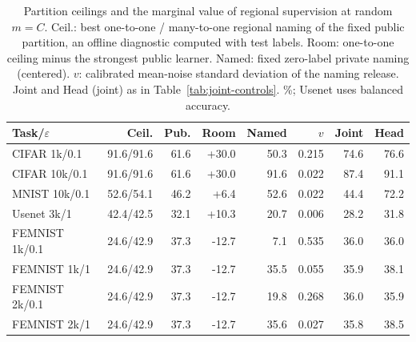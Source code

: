 \begin{table}[t]
\caption{Partition ceilings and the marginal value of regional supervision at random $m=C$. Ceil.: best one-to-one / many-to-one regional naming of the fixed public partition, an offline diagnostic computed with test labels. Room: one-to-one ceiling minus the strongest public learner. Named: fixed zero-label private naming (centered). $v$: calibrated mean-noise standard deviation of the naming release. Joint and Head (joint) as in Table~\ref{tab:joint-controls}. \%; Usenet uses balanced accuracy.}
\label{tab:ceiling}\small
\centering
\setlength{\tabcolsep}{2.6pt}
\begin{tabular}{@{}lrrrrrrr@{}}\toprule
Task/$\varepsilon$ & Ceil. & Pub. & Room & Named & $v$ & Joint & Head \\
\midrule
CIFAR 1k/0.1 & 91.6/91.6 & 61.6 & +30.0 & 50.3 & 0.215 & 74.6 & 76.6 \\
CIFAR 10k/0.1 & 91.6/91.6 & 61.6 & +30.0 & 91.6 & 0.022 & 87.4 & 91.1 \\
MNIST 10k/0.1 & 52.6/54.1 & 46.2 & +6.4 & 52.6 & 0.022 & 44.4 & 72.2 \\
Usenet 3k/1 & 42.4/42.5 & 32.1 & +10.3 & 20.7 & 0.006 & 28.2 & 31.8 \\
FEMNIST 1k/0.1 & 24.6/42.9 & 37.3 & -12.7 & 7.1 & 0.535 & 36.0 & 36.0 \\
FEMNIST 1k/1 & 24.6/42.9 & 37.3 & -12.7 & 35.5 & 0.055 & 35.9 & 38.1 \\
FEMNIST 2k/0.1 & 24.6/42.9 & 37.3 & -12.7 & 19.8 & 0.268 & 36.0 & 35.9 \\
FEMNIST 2k/1 & 24.6/42.9 & 37.3 & -12.7 & 35.6 & 0.027 & 35.8 & 38.5 \\
\bottomrule\end{tabular}
\end{table}
